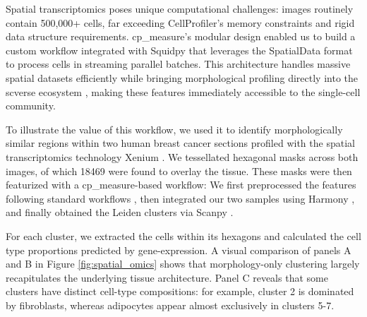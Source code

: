 \documentclass{article}
\begin{document}
Spatial transcriptomics poses unique computational challenges: images routinely contain 500,000+ cells, far exceeding CellProfiler's memory constraints and rigid data structure requirements. 
cp\_measure's modular design enabled us to build a custom workflow integrated with Squidpy \citep{pallaSquidpyScalableFramework2022} that leverages the SpatialData format \citep{Marconato2024-SpatialData} to process cells in streaming parallel batches. 
This architecture handles massive spatial datasets efficiently while bringing morphological profiling directly into the scverse ecosystem \citep{Virshup2023-scverse}, making these features immediately accessible to the single-cell community.

To illustrate the value of this workflow, we used it to identify morphologically similar regions within two human breast cancer sections profiled with the spatial transcriptomics technology Xenium \citep{10x-Genomics2023-el}. We tessellated hexagonal masks across both images, of which 18469 were found to overlay the tissue. These masks were then featurized with a cp\_measure-based workflow: We first preprocessed the features following standard workflows
\citep{serranoReproducibleImagebasedProfiling2025}, then integrated our two samples using Harmony \citep{Korsunsky2019-Harmony}, and finally obtained the Leiden clusters via Scanpy \citep{wolfSCANPYLargescaleSinglecell2018}. 

For each cluster, we extracted the cells within its hexagons and calculated the cell type proportions predicted by gene-expression. A visual comparison of panels A and B in Figure \ref{fig:spatial_omics} shows that morphology-only clustering largely recapitulates the underlying tissue architecture. Panel C reveals that some clusters have distinct cell-type compositions: for example, cluster 2 is dominated by fibroblasts, whereas adipocytes appear almost exclusively in clusters 5-7.
\end{document}
